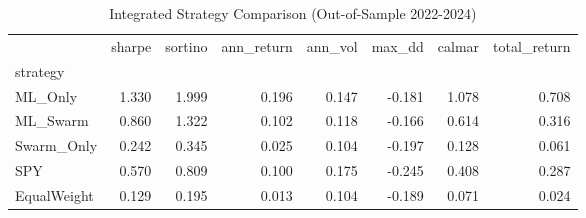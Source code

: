 \begin{table}
\caption{Integrated Strategy Comparison (Out-of-Sample 2022-2024)}
\label{tab:integrated_comparison}
\begin{tabular}{lrrrrrrr}
\toprule
 & sharpe & sortino & ann_return & ann_vol & max_dd & calmar & total_return \\
strategy &  &  &  &  &  &  &  \\
\midrule
ML_Only & 1.330 & 1.999 & 0.196 & 0.147 & -0.181 & 1.078 & 0.708 \\
ML_Swarm & 0.860 & 1.322 & 0.102 & 0.118 & -0.166 & 0.614 & 0.316 \\
Swarm_Only & 0.242 & 0.345 & 0.025 & 0.104 & -0.197 & 0.128 & 0.061 \\
SPY & 0.570 & 0.809 & 0.100 & 0.175 & -0.245 & 0.408 & 0.287 \\
EqualWeight & 0.129 & 0.195 & 0.013 & 0.104 & -0.189 & 0.071 & 0.024 \\
\bottomrule
\end{tabular}
\end{table}
